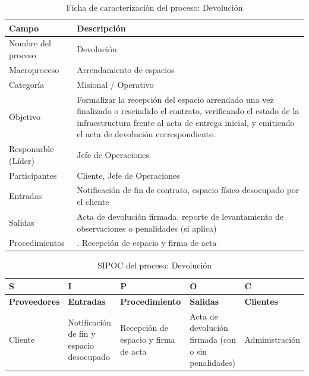 \documentclass[11pt, a4paper, oneside]{report}
\begin{document}
\begin{table}[H]
\centering\small
\renewcommand{\arraystretch}{1.35}
\setlength{\tabcolsep}{6pt}
\begin{tabularx}{\textwidth}{|>{\raggedright\arraybackslash}p{}|>{\raggedright\arraybackslash}X|}
\hline
\rowcolor{upeu_dark}
\color{white}\bfseries Campo & \color{white}\bfseries Descripción \\ \hline
\rowcolor{gray!10}
Nombre del proceso & Devolución \\ \hline
Macroproceso & Arrendamiento de espacios \\ \hline
\rowcolor{gray!10}
Categoría & Misional / Operativo \\ \hline
Objetivo & Formalizar la recepción del espacio arrendado una vez finalizado o rescindido el contrato, verificando el estado de la infraestructura frente al acta de entrega inicial, y emitiendo el acta de devolución correspondiente. \\ \hline
\rowcolor{gray!10}
Responsable (Líder) & Jefe de Operaciones \\ \hline
Participantes & Cliente, Jefe de Operaciones \\ \hline
\rowcolor{gray!10}
Entradas & Notificación de fin de contrato, espacio físico desocupado por el cliente \\ \hline
Salidas & Acta de devolución firmada, reporte de levantamiento de observaciones o penalidades (si aplica) \\ \hline
\rowcolor{gray!10}
Procedimientos & 1. Recepción de espacio y firma de acta \\ \hline
\end{tabularx}
\caption{Ficha de caracterización del proceso: Devolución}
\end{table}

\begin{table}[H]
\centering\small
\renewcommand{\arraystretch}{1.3}
\setlength{\tabcolsep}{4pt}
\begin{tabularx}{\textwidth}{|>{\raggedright\arraybackslash}p{}|>{\raggedright\arraybackslash}p{}|>{\raggedright\arraybackslash}p{}|>{\raggedright\arraybackslash}p{}|>{\raggedright\arraybackslash}X|}
\hline
\rowcolor{upeu_dark}
\color{white}\bfseries S & \color{white}\bfseries I & \color{white}\bfseries P & \color{white}\bfseries O & \color{white}\bfseries C \\ \hline
\rowcolor{upeu_light}
\bfseries Proveedores & \bfseries Entradas & \bfseries Procedimiento & \bfseries Salidas & \bfseries Clientes \\ \hline
Cliente &
Notificación de fin y espacio desocupado &
Recepción de espacio y firma de acta &
Acta de devolución firmada (con o sin penalidades) &
Administración \\ \hline
\end{tabularx}
\caption{SIPOC del proceso: Devolución}
\end{table}
\end{document}
